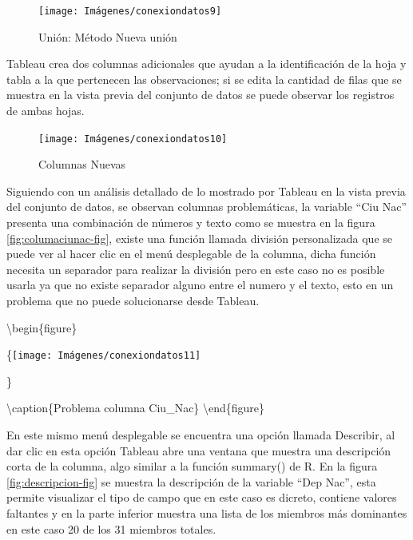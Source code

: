 \documentclass[
]{book}
\begin{document}
\begin{figure}

{\centering \texttt{[image: Imágenes/conexiondatos9]} 

}

\caption{Unión: Método Nueva unión}\label{fig:unionnueva-fig}
\end{figure}

Tableau crea dos columnas adicionales que ayudan a la identificación de la hoja y tabla a la que pertenecen las observaciones; si se edita la cantidad de filas que se muestra en la vista previa del conjunto de datos se puede observar los registros de ambas hojas.

\begin{figure}

{\centering \texttt{[image: Imágenes/conexiondatos10]} 

}

\caption{Columnas Nuevas}\label{fig:nuevascolumnas-fig}
\end{figure}

Siguiendo con un análisis detallado de lo mostrado por Tableau en la vista previa del conjunto de datos, se observan columnas problemáticas, la variable ``Ciu Nac'' presenta una combinación de números y texto como se muestra en la figura \ref{fig:columaciunac-fig}, existe una función llamada división personalizada que se puede ver al hacer clic en el menú desplegable de la columna, dicha función necesita un separador para realizar la división pero en este caso no es posible usarla ya que no existe separador alguno entre el numero y el texto, esto en un problema que no puede solucionarse desde Tableau.

\textbackslash begin\{figure\}

\{\centering \texttt{[image: Imágenes/conexiondatos11]}

\}

\textbackslash caption\{Problema columna Ciu\_Nac\}\label{fig:columaciunac-fig}
\textbackslash end\{figure\}

En este mismo menú desplegable se encuentra una opción llamada Describir, al dar clic en esta opción Tableau abre una ventana que muestra una descripción corta de la columna, algo similar a la función summary() de R. En la figura \ref{fig:descripcion-fig} se muestra la descripción de la variable ``Dep Nac'', esta permite visualizar el tipo de campo que en este caso es dicreto, contiene valores faltantes y en la parte inferior muestra una lista de los miembros más dominantes en este caso 20 de los 31 miembros totales.
\end{document}
